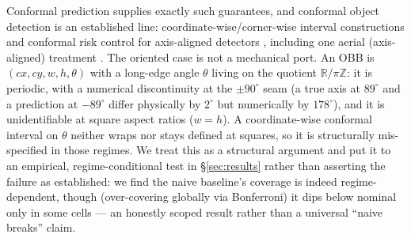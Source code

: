 \documentclass[11pt]{article}
\begin{document}
Conformal prediction supplies exactly such guarantees, and conformal object detection is an established line:
coordinate-wise/corner-wise interval constructions and conformal risk control for axis-aligned detectors
\citep{andeol2023conformal,timans2024twostep,andeol2025seqcrc,ries2026probabilistic,angelopoulos2022crc},
including one aerial (axis-aligned) treatment \citep{copley2024copa}. The oriented case is not a
mechanical port. An OBB is $(cx, cy, w, h, \theta)$ with a long-edge angle $\theta$ living on the quotient
$\mathbb{R}/\pi\mathbb{Z}$: it is periodic, with a numerical discontinuity at the $\pm 90^\circ$ seam (a true
axis at $89^\circ$ and a prediction at $-89^\circ$ differ physically by $2^\circ$ but numerically by
$178^\circ$), and it is unidentifiable at square aspect ratios ($w=h$). A coordinate-wise conformal interval
on $\theta$ neither wraps nor stays defined at squares, so it is structurally mis-specified in those
regimes. We treat this as a structural argument and put it to an empirical, regime-conditional test in
\S\ref{sec:results} rather than asserting the failure as established: we find the naive baseline's coverage is
indeed regime-dependent, though (over-covering globally via Bonferroni) it dips below nominal only in some
cells --- an honestly scoped result rather than a universal ``naive breaks'' claim.
\end{document}
